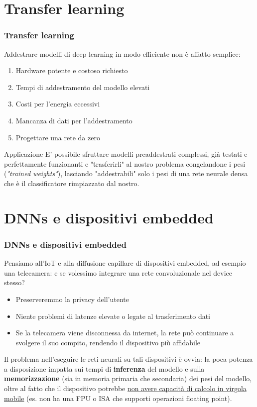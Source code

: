 \documentclass{beamer}
\newcommand{\dflvspace}{\vspace{10pt}}
\begin{document}
\section{Transfer learning}
\begin{frame}
    \frametitle{Transfer learning}
    
    Addestrare modelli di deep learning in modo efficiente non è affatto semplice:
    \begin{enumerate}
    	\item Hardware potente e costoso richiesto
    	\item Tempi di addestramento del modello elevati
    	\item Costi per l'energia eccessivi
    	\item Mancanza di dati per l'addestramento
    	\item Progettare una rete da zero
    \end{enumerate}
    
    \dflvspace
    
    \begin{exampleblock}{Applicazione}
    E' possibile sfruttare modelli preaddestrati complessi, già testati e perfettamente funzionanti e "trasferirli" al
    nostro problema congelandone i pesi (\textit{"trained weights"}), lasciando "addestrabili" solo i pesi di una rete neurale densa che è il
    classificatore rimpiazzato dal nostro.
    \end{exampleblock}
\end{frame}

\section{DNNs e dispositivi embedded}
\begin{frame}
    \frametitle{DNNs e dispositivi embedded}
    
    Pensiamo all'IoT e alla diffusione capillare di dispositivi embedded, ad esempio una telecamera: e se volessimo
    integrare una rete convoluzionale nel device stesso?
    \begin{itemize}
    	\item Preserveremmo la privacy dell'utente
    	\item Niente problemi di latenze elevate o legate al trasferimento dati
    	\item Se la telecamera viene disconnessa da internet, la rete può continuare a svolgere il suo compito, rendendo il dispositivo
    	più affidabile
    \end{itemize}
    
    \dflvspace
    
    Il problema nell'eseguire le reti neurali su tali dispositivi è ovvia: la poca potenza a disposizione 
    impatta sui tempi di \textbf{inferenza} del modello e sulla \textbf{memorizzazione} 
    (sia in memoria primaria che secondaria) dei pesi del modello, oltre al fatto che il dispositivo potrebbe \underline{non avere
    capacità di calcolo in virgola mobile} (es. non ha una FPU o ISA che supporti operazioni floating point).

\end{frame}
\end{document}
